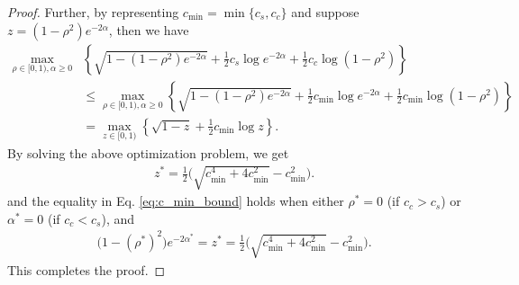 \documentclass[12pt]{article}
\theoremstyle{definition}
\theoremstyle{remark}
\begin{document}
\begin{proof}
Further, by representing $c_{\text{min}} = \min\{c_s, c_c\}$ and suppose $z = (1-\rho^2)e^{-2\alpha}$, then we have
\begin{align}
\label{eq:c_min_bound}
    \max_{\rho \in [0,1), \alpha \geq 0} & \left\{ \sqrt{1-(1-\rho^2)e^{-2\alpha}} + \frac{1}{2}  c_s\log e^{-2\alpha} + \frac{1}{2} c_c \log(1-\rho^2) \right\} \nonumber\\
    & \leq \max_{\rho \in [0,1), \alpha \geq 0}  \left\{ \sqrt{1-(1-\rho^2)e^{-2\alpha}} + \frac{1}{2}  c_{\text{min}}\log e^{-2\alpha} + \frac{1}{2} c_{\text{min}} \log(1-\rho^2) \right\} \nonumber\\
    & = \max_{z \in [0,1)} \left\{ \sqrt{1-z} + \frac{1}{2}  c_{\text{min}}\log z \right\}.
\end{align}
By solving the above optimization problem, we get
\begin{align*}
    z^* = \frac{1}{2}  \Big( \sqrt{c_{\min}^4+ 4 c_{\min}^2} -c_{\min}^2 \Big).
\end{align*}
and the equality in Eq. \eqref{eq:c_min_bound} holds when either $\rho^* =0$ (if $c_c > c_s$) or $\alpha^* =0$ (if $c_c < c_s$), and
\begin{align*}
    \big(1-(\rho^*)^2\big)e^{-2\alpha^*} = z^* = \frac{1}{2}  \Big( \sqrt{c_{\min}^4+ 4 c_{\min}^2} -c_{\min}^2 \Big).
\end{align*}
This completes the proof.
\end{proof}
\end{document}
